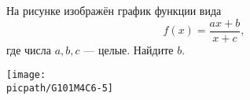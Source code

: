 \begin{class}[number=6]
\begin{listofex}
		\item
		\begin{minipage}[t]{\bodywidth}
			На рисунке изображён график функции вида \[ f(x)=\dfrac{ax+b}{x+c}, \] где числа \(a, b, c\) --- целые. Найдите \(b\).
		\end{minipage}
		\hspace{0.02\linewidth}
		\begin{minipage}[t]{\picwidth}
			\texttt{[image: \\picpath/G101M4C6-5]}
		\end{minipage}
	\end{listofex}
\end{class}
%
%
